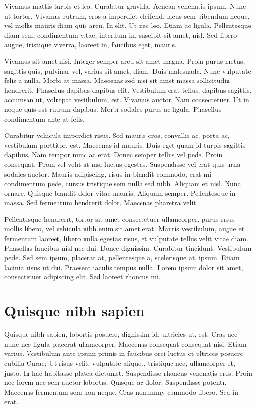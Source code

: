 Vivamus mattis turpis et leo. Curabitur gravida. Aenean venenatis
ipsum. Nunc ut tortor. Vivamus rutrum, eros a imperdiet eleifend,
lacus sem bibendum neque, vel mollis mauris diam quis arcu. In
elit. Ut nec leo. Etiam ac ligula. Pellentesque diam sem, condimentum
vitae, interdum in, suscipit sit amet, nisl. Sed libero augue,
tristique viverra, laoreet in, faucibus eget, mauris.

Vivamus sit amet nisi. Integer semper arcu sit amet magna. Proin purus
metus, sagittis quis, pulvinar vel, varius sit amet, diam. Duis
malesuada. Nunc vulputate felis a nulla. Morbi at massa. Maecenas sed
nisi sit amet massa sollicitudin hendrerit. Phasellus dapibus dapibus
elit. Vestibulum erat tellus, dapibus sagittis, accumsan ut, volutpat
vestibulum, est. Vivamus auctor. Nam consectetuer. Ut in neque quis
est rutrum dapibus. Morbi sodales purus ac ligula. Phasellus
condimentum ante at felis.

Curabitur vehicula imperdiet risus. Sed mauris eros, convallis ac,
porta ac, vestibulum porttitor, est. Maecenas id mauris. Duis eget
quam id turpis sagittis dapibus. Nam tempor nunc ac erat. Donec semper
tellus vel pede. Proin consequat. Proin vel velit at nisi luctus
egestas. Suspendisse vel erat quis urna sodales auctor. Mauris
adipiscing, risus in blandit commodo, erat mi condimentum pede, cursus
tristique sem nulla sed nibh. Aliquam et nisl. Nunc ornare. Quisque
blandit dolor vitae mauris. Aliquam semper. Pellentesque in massa. Sed
fermentum hendrerit dolor. Maecenas pharetra velit.

Pellentesque hendrerit, tortor sit amet consectetuer ullamcorper,
purus risus mollis libero, vel vehicula nibh enim sit amet
erat. Mauris vestibulum, augue et fermentum laoreet, libero nulla
egestas risus, et vulputate tellus velit vitae diam. Phasellus
faucibus nisl nec dui. Donec dignissim. Curabitur
tincidunt. Vestibulum pede. Sed sem ipsum, placerat at, pellentesque
a, scelerisque at, ipsum. Etiam lacinia risus ut dui. Praesent iaculis
tempus nulla. Lorem ipsum dolor sit amet, consectetuer adipiscing
elit. Sed laoreet rhoncus mi.

\chapter{Quisque nibh sapien}
Quisque nibh sapien, lobortis posuere, dignissim id, ultricies ut,
est. Cras nec nunc nec ligula placerat ullamcorper. Maecenas consequat
consequat nisi. Etiam varius. Vestibulum ante ipsum primis in faucibus
orci luctus et ultrices posuere cubilia Curae; Ut risus velit,
vulputate aliquet, tristique nec, ullamcorper et, justo. In hac
habitasse platea dictumst. Suspendisse rhoncus venenatis eros. Proin
nec lorem nec sem auctor lobortis. Quisque ac dolor. Suspendisse
potenti. Maecenas fermentum sem non neque. Cras nonummy commodo
libero. Sed in erat.


